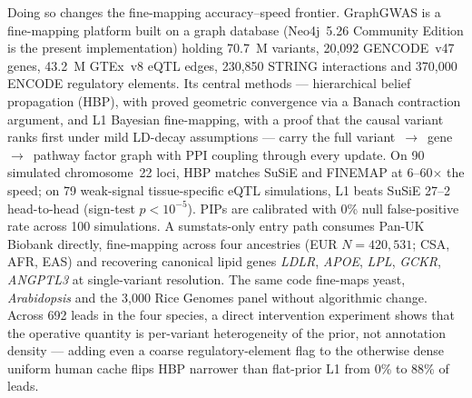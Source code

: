 Doing so changes the fine-mapping
accuracy--speed frontier. GraphGWAS is a fine-mapping platform
built on a graph database (Neo4j~5.26 Community Edition is the
present implementation\cite{robinson2015graph}) holding 70.7~M
variants, 20{,}092 GENCODE~v47 genes\cite{frankish2023gencode},
43.2~M GTEx~v8 eQTL edges, 230{,}850 STRING interactions and
370{,}000 ENCODE regulatory elements. Its central methods ---
hierarchical belief propagation (HBP), with proved geometric
convergence via a Banach contraction argument, and L1 Bayesian
fine-mapping, with a proof that the causal variant ranks first
under mild LD-decay assumptions --- carry the full
variant~$\rightarrow$~gene$\rightarrow$~pathway factor graph with
PPI coupling through every update. On 90 simulated chromosome~22
loci, HBP matches SuSiE and FINEMAP at 6--60$\times$ the speed; on
79 weak-signal tissue-specific eQTL simulations, L1 beats SuSiE
27--2 head-to-head (sign-test $p < 10^{-5}$). PIPs are calibrated
with 0\% null false-positive rate across 100 simulations. A
sumstats-only entry path consumes Pan-UK Biobank\cite{karczewski2024pan}
directly, fine-mapping across four ancestries
(EUR $N{=}420{,}531$; CSA, AFR, EAS) and recovering canonical
lipid genes \emph{LDLR}, \emph{APOE}, \emph{LPL}, \emph{GCKR},
\emph{ANGPTL3} at single-variant resolution. The same code
fine-maps yeast\cite{peter2018genome},
\emph{Arabidopsis}\cite{alonso20161001} and the 3{,}000 Rice
Genomes panel without algorithmic change. Across 692 leads in
the four species, a direct intervention experiment shows that the
operative quantity is per-variant heterogeneity of the prior, not
annotation density --- adding even a coarse regulatory-element
flag to the otherwise dense uniform human cache flips HBP
narrower than flat-prior L1 from 0\% to 88\% of leads.
